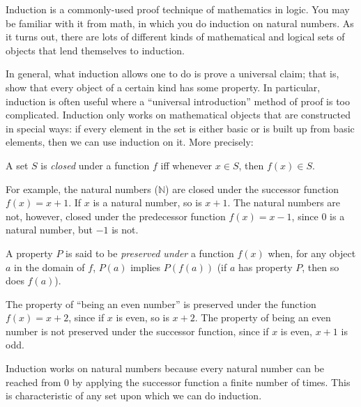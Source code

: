 \documentclass[../../include/open-logic-section]{subfiles}
\begin{document}


\begin{explain}
Induction is a commonly-used proof technique of mathematics in logic.
You may be familiar with it from math, in which you do induction on
natural numbers. As it turns out, there are lots of different kinds of
mathematical and logical sets of objects that lend themselves to induction.

In general, what induction allows one to do is prove a universal claim; that
is, show that every object of a certain kind has some property. In particular,
induction is often useful where a ``universal introduction'' method of proof
is too complicated. Induction only works on mathematical objects that are
constructed in special ways: if every element in the set is either basic or is
built up from basic elements, then we can use induction on it. More precisely:
\end{explain}

\begin{defn}
A set $S$ is \emph{closed} under a function $f$ iff whenever $x \in
S$, then $f(x) \in S$.
\end{defn}

\begin{explain}
For example, the natural numbers ($\mathbb{N}$) are closed under the
successor function $f(x) = x+1$. If $x$ is a natural number, so is
$x+1$. The natural numbers are not, however, closed under the
predecessor function $f(x) = x-1$, since $0$ is a natural number, but
$-1$ is not.
\end{explain}

\begin{defn}
A property $P$ is said to be \emph{preserved under} a function $f(x)$
when, for any object $a$ in the domain of $f$, $P(a)$ implies
$P(f(a))$ (if $a$ has property $P$, then so does $f(a)$).
\end{defn}

\begin{explain}
The property of ``being an even number'' is preserved under the
function $f(x) = x+2$, since if $x$ is even, so is $x+2$. The property
of being an even number is not preserved under the successor function,
since if $x$ is even, $x+1$ is odd.

Induction works on natural numbers because every natural number can be
reached from 0 by applying the successor function a finite number of
times. This is characteristic of any set upon which we can do
induction.
\end{explain}
\end{document}

